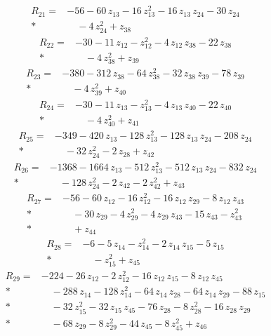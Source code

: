 \documentclass[10pt]{article}
\begin{document}
\begin{align*}
R_{21}={}& - 56 - 60\,z_{13} - 16\,z_{13}^{2} - 16\,z_{13}\,z_{24} - 30\,z_{24} \\*
&\quad - 4\,z_{24}^{2} + z_{38}
\end{align*}
\begin{align*}
R_{22}={}& - 30 - 11\,z_{12} - z_{12}^{2} - 4\,z_{12}\,z_{38} - 22\,z_{38} \\*
&\quad - 4\,z_{38}^{2} + z_{39}
\end{align*}
\begin{align*}
R_{23}={}& - 380 - 312\,z_{38} - 64\,z_{38}^{2} - 32\,z_{38}\,z_{39} - 78\,z_{39} \\*
&\quad - 4\,z_{39}^{2} + z_{40}
\end{align*}
\begin{align*}
R_{24}={}& - 30 - 11\,z_{13} - z_{13}^{2} - 4\,z_{13}\,z_{40} - 22\,z_{40} \\*
&\quad - 4\,z_{40}^{2} + z_{41}
\end{align*}
\begin{align*}
R_{25}={}& - 349 - 420\,z_{13} - 128\,z_{13}^{2} - 128\,z_{13}\,z_{24} - 208\,z_{24} \\*
&\quad - 32\,z_{24}^{2} - 2\,z_{28} + z_{42}
\end{align*}
\begin{align*}
R_{26}={}& - 1368 - 1664\,z_{13} - 512\,z_{13}^{2} - 512\,z_{13}\,z_{24} - 832\,z_{24} \\*
&\quad - 128\,z_{24}^{2} - 2\,z_{42} - 2\,z_{42}^{2} + z_{43}
\end{align*}
\begin{align*}
R_{27}={}& - 56 - 60\,z_{12} - 16\,z_{12}^{2} - 16\,z_{12}\,z_{29} - 8\,z_{12}\,z_{43} \\*
&\quad - 30\,z_{29} - 4\,z_{29}^{2} - 4\,z_{29}\,z_{43} - 15\,z_{43} - z_{43}^{2} \\*
&\quad + z_{44}
\end{align*}
\begin{align*}
R_{28}={}& - 6 - 5\,z_{14} - z_{14}^{2} - 2\,z_{14}\,z_{15} - 5\,z_{15} \\*
&\quad - z_{15}^{2} + z_{45}
\end{align*}
\begin{align*}
R_{29}={}& - 224 - 26\,z_{12} - 2\,z_{12}^{2} - 16\,z_{12}\,z_{15} - 8\,z_{12}\,z_{45} \\*
&\quad - 288\,z_{14} - 128\,z_{14}^{2} - 64\,z_{14}\,z_{28} - 64\,z_{14}\,z_{29} - 88\,z_{15} \\*
&\quad - 32\,z_{15}^{2} - 32\,z_{15}\,z_{45} - 76\,z_{28} - 8\,z_{28}^{2} - 16\,z_{28}\,z_{29} \\*
&\quad - 68\,z_{29} - 8\,z_{29}^{2} - 44\,z_{45} - 8\,z_{45}^{2} + z_{46}
\end{align*}
\end{document}
